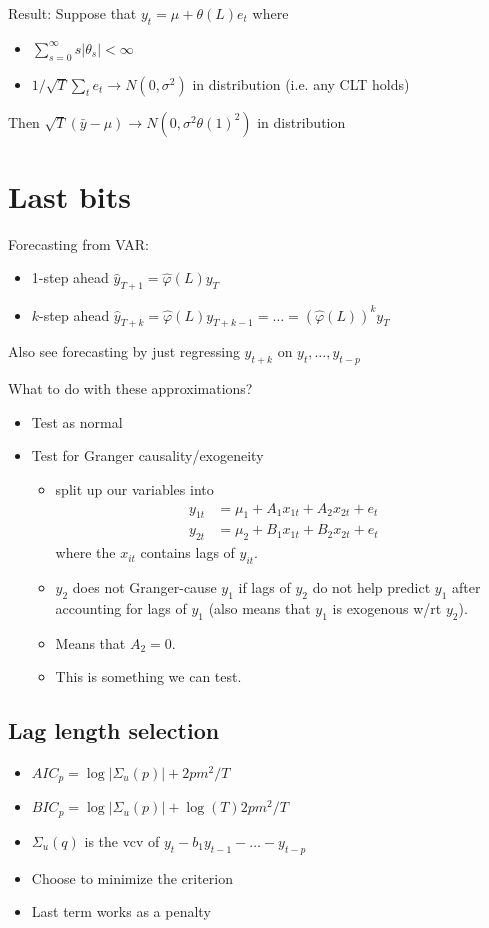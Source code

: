 Result: Suppose that $y_t = μ + θ(L) e_t$ where
\begin{itemize}
\item $∑_{s=0}^∞ s |θ_s| < ∞$
\item $1/\sqrt{T} ∑_t e_t → N(0, σ^2)$ in distribution (i.e. any CLT
  holds)
\end{itemize}
Then $\sqrt{T} (\bar y - μ ) → N( 0, σ^2 θ(1)^2 )$ in distribution

\section{Last bits}

Forecasting from VAR:
\begin{itemize}
\item 1-step ahead $\hat y_{T+1} = \hat φ(L) y_T$
\item $k$-step ahead $\hat y_{T+k} = \hat φ(L) y_{T+k-1} = … = ( \hat
  φ(L) )^k y_T$
\end{itemize}
Also see forecasting by just regressing $y_{t+k}$ on $y_t,…,y_{t-p}$

What to do with these approximations?
\begin{itemize}
\item Test as normal
\item Test for Granger causality/exogeneity
  \begin{itemize}
  \item split up our variables into
    \begin{align*}
      y_{1t} &= μ_1 + A_1 x_{1t} + A_2 x_{2t} + e_t \\
      y_{2t} &= μ_2 + B_1 x_{1t} + B_2 x_{2t} + e_t
    \end{align*}
    where the $x_{it}$ contains lags of $y_{it}$.
  \item $y_2$ does not Granger-cause $y_1$ if lags of $y_2$ do not
    help predict $y_1$ after accounting for lags of $y_1$ (also means
    that $y_1$ is exogenous w/rt $y_2$).
  \item Means that $A_2 = 0$.
  \item This is something we can test.
  \end{itemize}
\end{itemize}

\subsection{Lag length selection}

\begin{itemize}
\item $AIC_p = \log | Σ_u(p)| + 2 p m^2 / T$
\item $BIC_p = \log | Σ_u(p)| + \log(T) 2 p m^2 / T$
\item $Σ_u(q)$ is the vcv of $y_t - b_1 y_{t-1} - … - y_{t-p}$
\item Choose to minimize the criterion
\item Last term works as a penalty
\end{itemize}

